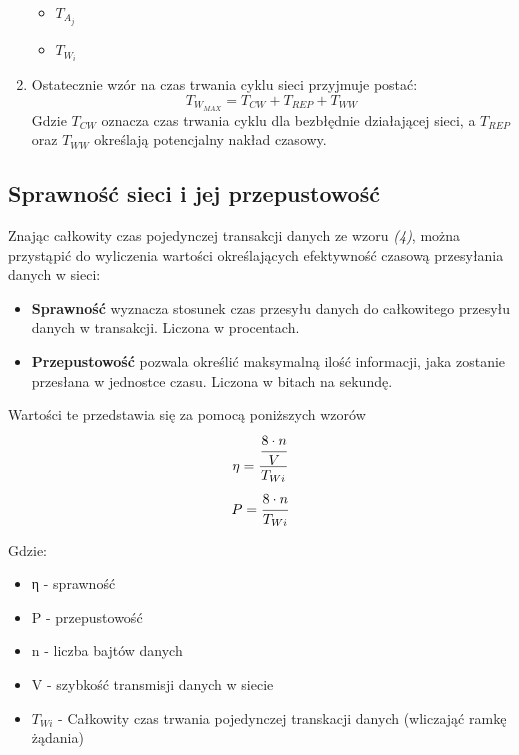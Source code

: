 \documentclass[a4paper,twoside]{article}
\begin{document}
\begin{enumerate}
\begin{itemize}
			\item $ T_{A_j} $ 
			\item $ T_{W_i} $ 
		\end{itemize}
		\item Ostatecznie wzór na czas trwania cyklu sieci przyjmuje postać:
		\begin{equation}
			T_{W_{MAX}}=T_{CW}+T_{REP}+T_{WW}
		\end{equation}
		Gdzie $ T_{CW} $ oznacza czas trwania cyklu dla bezbłędnie działającej sieci, a $ T_{REP} $ oraz $ T_{WW} $ określają potencjalny nakład czasowy.
	\end{enumerate}



	\subsection{Sprawność sieci i jej przepustowość}
	Znając całkowity czas pojedynczej transakcji danych ze wzoru \textit{(4)}, można przystąpić do wyliczenia wartości określających efektywność czasową przesyłania danych w sieci:
	\begin{itemize}
		\item \textbf{Sprawność} wyznacza stosunek czas przesyłu danych do całkowitego przesyłu danych w transakcji. Liczona w procentach.
		\item \textbf{Przepustowość} pozwala określić maksymalną ilość informacji, jaka zostanie przesłana w jednostce czasu. Liczona w bitach na sekundę.
	\end{itemize}
	
	Wartości te przedstawia się za pomocą poniższych wzorów
	\begin{equation}
	\eta = \cfrac{\cfrac{8\cdot n}{V}}{T_{Wi}}   
	\end{equation}
	\begin{equation}
	P = \cfrac{8\cdot n}{T_{Wi}}
	\end{equation}
	
	Gdzie:
	\begin{itemize}
		\item η - sprawność
		\item P - przepustowość
		\item n - liczba bajtów danych
		\item V - szybkość transmisji danych w siecie
		\item $ T_{Wi} $ - Całkowity czas trwania pojedynczej transkacji danych (wliczająć ramkę żądania)
	\end{itemize}
	
\end{document}
